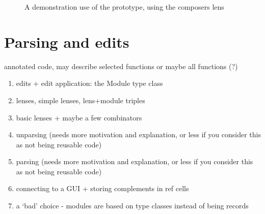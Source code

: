 \begin{figure}
    \centering
    \hfil
    \vspace{4ex}

    \hfil
    \vspace{4ex}

    \hfil
    \vspace{4ex}

    \hfil
    \vspace{4ex}

    \caption{A demonstration use of the prototype, using the composers lens}
    \label{fig:prototype-screenshots}
\end{figure}

\section{Parsing and edits}
\label{sec:parsing}
annotated code, may describe selected functions or maybe all functions (?)
\begin{enumerate}
    \item edits + edit application: the Module type class
    \item lenses, simple lenses, lens+module triples
    \item basic lenses + maybe a few combinators
    \item unparsing (needs more motivation and explanation, or less if you consider this as not being reusable code)
    \item parsing (needs more motivation and explanation, or less if you consider this as not being reusable code)
    \item connecting to a GUI + storing complements in ref cells
    \item a `bad' choice - modules are based on type classes instead of being records
\end{enumerate}

